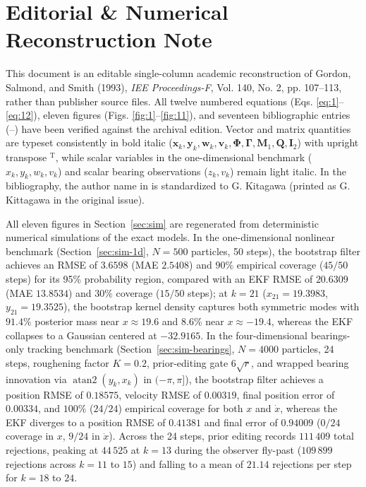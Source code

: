 \section*{Editorial \& Numerical Reconstruction Note}

This document is an editable single-column academic reconstruction of Gordon, Salmond, and Smith (1993), \emph{IEE Proceedings-F}, Vol. 140, No. 2, pp. 107–113, rather than publisher source files. All twelve numbered equations (Eqs. \eqref{eq:1}–\eqref{eq:12}), eleven figures (Figs. \ref{fig:1}–\ref{fig:11}), and seventeen bibliographic entries (\cite{r01}–\cite{r17}) have been verified against the archival edition. Vector and matrix quantities are typeset consistently in bold italic ($\bm{x}_k, \bm{y}_k, \bm{w}_k, \bm{v}_k, \bm{\Phi}, \bm{\Gamma}, \bm{M}_1, \bm{Q}, \bm{I}_2$) with upright transpose $^{\mathrm{T}}$, while scalar variables in the one-dimensional benchmark ($x_k, y_k, w_k, v_k$) and scalar bearing observations ($z_k, v_k$) remain light italic. In the bibliography, the author name in \cite{r08} is standardized to G. Kitagawa (printed as G. Kittagawa in the original issue).

All eleven figures in Section~\ref{sec:sim} are regenerated from deterministic numerical simulations of the exact models. In the one-dimensional nonlinear benchmark (Section~\ref{sec:sim-1d}, $N = 500$ particles, 50 steps), the bootstrap filter achieves an RMSE of $3.6598$ (MAE $2.5408$) and $90\%$ empirical coverage ($45/50$ steps) for its 95\% probability region, compared with an EKF RMSE of $20.6309$ (MAE $13.8534$) and $30\%$ coverage ($15/50$ steps); at $k = 21$ ($x_{21} = 19.3983$, $y_{21} = 19.3525$), the bootstrap kernel density captures both symmetric modes with $91.4\%$ posterior mass near $x \approx 19.6$ and $8.6\%$ near $x \approx -19.4$, whereas the EKF collapses to a Gaussian centered at $-32.9165$. In the four-dimensional bearings-only tracking benchmark (Section~\ref{sec:sim-bearings}, $N = 4000$ particles, 24 steps, roughening factor $K = 0.2$, prior-editing gate $6\sqrt{r}$, and wrapped bearing innovation via $\operatorname{atan2}(y_k, x_k)$ in $(-\pi, \pi]$), the bootstrap filter achieves a position RMSE of $0.18575$, velocity RMSE of $0.00319$, final position error of $0.00334$, and $100\%$ ($24/24$) empirical coverage for both $x$ and $\dot{x}$, whereas the EKF diverges to a position RMSE of $0.41381$ and final error of $0.94009$ ($0/24$ coverage in $x$, $9/24$ in $\dot{x}$). Across the 24 steps, prior editing records $111\,409$ total rejections, peaking at $44\,525$ at $k = 13$ during the observer fly-past ($109\,899$ rejections across $k = 11$ to $15$) and falling to a mean of $21.14$ rejections per step for $k = 18$ to $24$.

